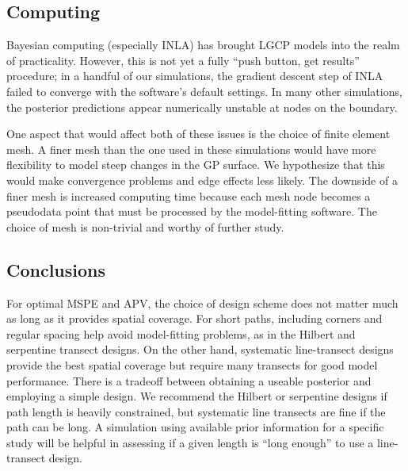 \documentclass[review]{elsarticle}
\begin{document}


\subsection{Computing}

Bayesian computing (especially INLA) has brought LGCP models into the realm of
practicality. However, this is not yet a fully ``push button, get results''
procedure; in a handful of our simulations, the gradient descent step of INLA
failed to converge with the software's default settings. In many other
simulations, the posterior predictions appear numerically unstable at nodes on
the boundary.

One aspect that would affect both of these issues is the choice of finite
element mesh. A finer mesh than the one used in these simulations would have
more flexibility to model steep changes in the GP surface. We hypothesize that
this would make convergence problems and edge effects less likely. The downside
of a finer mesh is increased computing time because each mesh node becomes a
pseudodata point that must be processed by the model-fitting software. The
choice of mesh is non-trivial and worthy of further study.


\subsection{Conclusions}

For optimal MSPE and APV, the choice of design scheme does not matter much as
long as it provides spatial coverage. For short paths, including corners and
regular spacing help avoid model-fitting problems, as in the Hilbert and
serpentine transect designs. On the other hand, systematic line-transect
designs provide the best spatial coverage but require many transects for good
model performance. There is a tradeoff between obtaining a useable posterior
and employing a simple design. We recommend the Hilbert or serpentine designs
if path length is heavily constrained, but systematic line transects are fine
if the path can be long. A simulation using available prior information for a
specific study will be helpful in assessing if a given length is ``long
enough'' to use a line-transect design.
\end{document}
